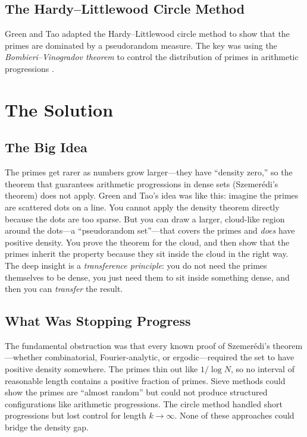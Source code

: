 \subsection{The Hardy--Littlewood Circle Method}

Green and Tao adapted the Hardy--Littlewood circle method to show that the primes are dominated by a pseudorandom measure. The key was using the \emph{Bombieri--Vinogradov theorem} to control the distribution of primes in arithmetic progressions \cite{bombieri1965}.

\section{The Solution}

\subsection{The Big Idea}
The primes get rarer as numbers grow larger---they have ``density zero,'' so the theorem that guarantees arithmetic progressions in dense sets (Szemer\'edi's theorem) does not apply. Green and Tao's idea was like this: imagine the primes are scattered dots on a line. You cannot apply the density theorem directly because the dots are too sparse. But you can draw a larger, cloud-like region around the dots---a ``pseudorandom set''---that covers the primes and \emph{does} have positive density. You prove the theorem for the cloud, and then show that the primes inherit the property because they sit inside the cloud in the right way. The deep insight is a \emph{transference principle}: you do not need the primes themselves to be dense, you just need them to sit inside something dense, and then you can \emph{transfer} the result.

\subsection{What Was Stopping Progress}
The fundamental obstruction was that every known proof of Szemer\'edi's theorem---whether combinatorial, Fourier-analytic, or ergodic---required the set to have positive density somewhere. The primes thin out like $1/\log N$, so no interval of reasonable length contains a positive fraction of primes. Sieve methods could show the primes are ``almost random'' but could not produce structured configurations like arithmetic progressions. The circle method handled short progressions but lost control for length $k \to \infty$. None of these approaches could bridge the density gap.

